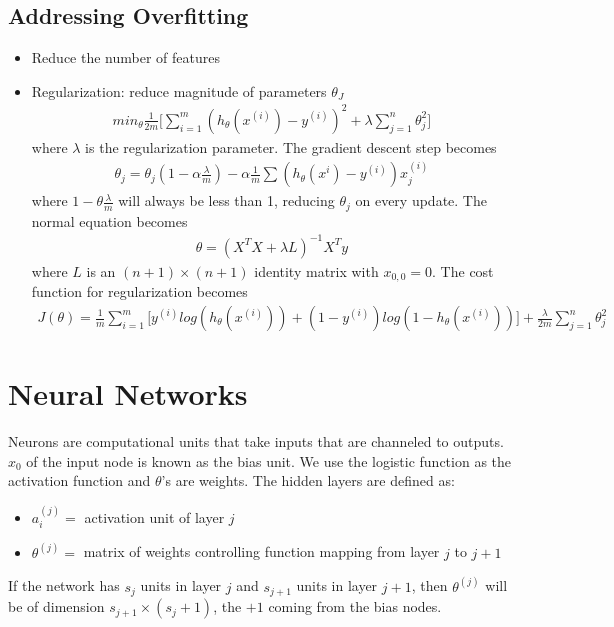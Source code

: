 \documentclass[12pt]{article}
\begin{document}
\subsection{Addressing Overfitting}
\begin{itemize}
	\item Reduce the number of features
    \item Regularization: reduce magnitude of parameters $\theta_J$ \begin{align*}
		min_\theta \frac{1}{2m}\bigg[\sum_{i=1}^{m}(h_\theta(x^{(i)})-y^{(i)})^2 + \lambda\sum_{j=1}^{n}\theta_j^2\bigg]
	\end{align*} where $\lambda$ is the regularization parameter. The gradient descent step becomes \begin{align*}
		\theta_j = \theta_j (1-\alpha\frac{\lambda}{m})-\alpha\frac{1}{m}\sum (h_\theta(x^{i})-y^{(i)})x_j^{(i)}
	\end{align*} where $1-\theta\frac{\lambda}{m}$ will always be less than 1, reducing $\theta_j$ on every update. The normal equation becomes \begin{align*}
		\theta = (X^TX + \lambda L)^{-1}X^Ty
	\end{align*} where $L$ is an $(n+1)\times (n+1)$ identity matrix with $x_{0,0}=0$. The cost function for regularization becomes \begin{align*}
		J(\theta) = \frac{1}{m}\sum_{i=1}^{m}\bigg[y^{(i)}log(h_\theta(x^{(i)}))+(1-y^{(i)})log(1-h_\theta(x^{(i)}))\bigg]+\frac{\lambda}{2m}\sum_{j=1}^{n}\theta_j^2
	\end{align*}
    \label{sec:regularization}
\end{itemize}

\section{Neural Networks}
Neurons are computational units that take inputs that are channeled to outputs. $x_0$ of the input node is known as the bias unit. We use the logistic function as the activation function and $\theta$'s are weights.
The hidden layers are defined as:
\begin{itemize}
	\item $a_i^{(j)} =$ activation unit of layer $j$
	\item $\theta^{(j)} =$ matrix of weights controlling function mapping from layer $j$ to $j+1$
\end{itemize}
If the network has $s_j$ units in layer $j$ and $s_{j+1}$ units in layer $j+1$, then $\theta^{(j)}$ will be of dimension $s_{j+1}\times (s_j+1)$, the $+1$ coming from the bias nodes.
\end{document}
